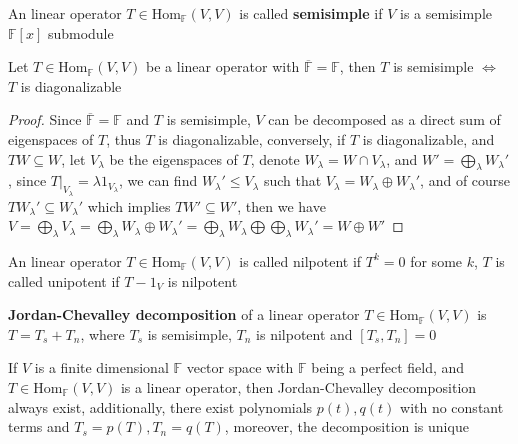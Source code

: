 \documentclass[main]{subfiles}
\begin{document}
\begin{definition}
An linear operator $T\in\mathrm{Hom}_{\mathbb F}(V,V)$ is called \textbf{semisimple} if $V$ is a semisimple $\mathbb F[x]$ submodule
\end{definition}

\begin{proposition}
Let $T\in\mathrm{Hom}_{\mathbb F}(V,V)$ be a linear operator with $\overline{\mathbb F}=\mathbb F$, then $T$ is semisimple $\Leftrightarrow$ $T$ is diagonalizable
\end{proposition}

\begin{proof}
Since $\overline{\mathbb F}=\mathbb F$ and $T$ is semisimple, $V$ can be decomposed as a direct sum of eigenspaces of $T$, thus $T$ is diagonalizable, conversely, if $T$ is diagonalizable, and $TW\subseteq W$, let $V_\lambda$ be the eigenspaces of $T$, denote $W_\lambda=W\cap V_\lambda$, and $W'=\bigoplus_{\lambda}W_\lambda'$, since $T|_{V_\lambda}=\lambda1_{V_\lambda}$, we can find $W_\lambda'\leq V_\lambda$ such that $V_\lambda=W_\lambda\oplus W_\lambda'$, and of course $TW_\lambda'\subseteq W_\lambda'$ which implies $TW'\subseteq W'$, then we have $V=\displaystyle\bigoplus_{\lambda}V_\lambda=\bigoplus_{\lambda}W_\lambda\oplus W_\lambda'=\bigoplus_{\lambda}W_\lambda\bigoplus\bigoplus_{\lambda}W_\lambda'=W\oplus W'$
\end{proof}

\begin{definition}
An linear operator $T\in\mathrm{Hom}_{\mathbb F}(V,V)$ is called nilpotent if $T^k=0$ for some $k$, $T$ is called unipotent if $T-1_V$ is nilpotent
\end{definition}

\begin{definition}\label{Jordan-Chevalley decomposition}
\textbf{Jordan-Chevalley decomposition} of a linear operator $T\in\mathrm{Hom}_{\mathbb F}(V,V)$  is $T=T_s+T_n$, where $T_s$ is semisimple, $T_n$ is nilpotent and $[T_s,T_n]=0$
\end{definition}

\begin{theorem}\label{Existence of Jordan-Chevalley decomposition}
If $V$ is a finite dimensional $\mathbb F$ vector space with $\mathbb F$ being a perfect field, and $T\in\mathrm{Hom}_{\mathbb F}(V,V)$ is a linear operator, then Jordan-Chevalley decomposition always exist, additionally, there exist polynomials $p(t),q(t)$ with no constant terms and $T_s=p(T),T_n=q(T)$, moreover, the decomposition is unique
\end{theorem}
\end{document}
